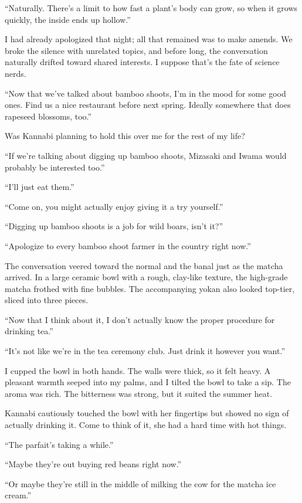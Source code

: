 \documentclass[
    a4paper,
    12pt,
    twoside,
    openany,
    UTF8,
    fontset=windows
]{ctexbook}
\begin{document}
``Naturally. There's a limit to how fast a plant's body can grow, so when it grows quickly, the inside ends up hollow.''

I had already apologized that night; all that remained was to make amends. We broke the silence with unrelated topics, and before long, the conversation naturally drifted toward shared interests. I suppose that's the fate of science nerds.

``Now that we've talked about bamboo shoots, I'm in the mood for some good ones. Find us a nice restaurant before next spring. Ideally somewhere that does rapeseed blossoms, too.''

Was Kannabi planning to hold this over me for the rest of my life?

``If we're talking about digging up bamboo shoots, Mizasaki and Iwama would probably be interested too.''

``I'll just eat them.''

``Come on, you might actually enjoy giving it a try yourself.''

``Digging up bamboo shoots is a job for wild boars, isn't it?''

``Apologize to every bamboo shoot farmer in the country right now.''

The conversation veered toward the normal and the banal just as the matcha arrived. In a large ceramic bowl with a rough, clay-like texture, the high-grade matcha frothed with fine bubbles. The accompanying yokan also looked top-tier, sliced into three pieces.

``Now that I think about it, I don't actually know the proper procedure for drinking tea.''

``It's not like we're in the tea ceremony club. Just drink it however you want.''

I cupped the bowl in both hands. The walls were thick, so it felt heavy. A pleasant warmth seeped into my palms, and I tilted the bowl to take a sip. The aroma was rich. The bitterness was strong, but it suited the summer heat.

Kannabi cautiously touched the bowl with her fingertips but showed no sign of actually drinking it. Come to think of it, she had a hard time with hot things.

``The parfait's taking a while.''

``Maybe they're out buying red beans right now.''

``Or maybe they're still in the middle of milking the cow for the matcha ice cream.''
\end{document}
